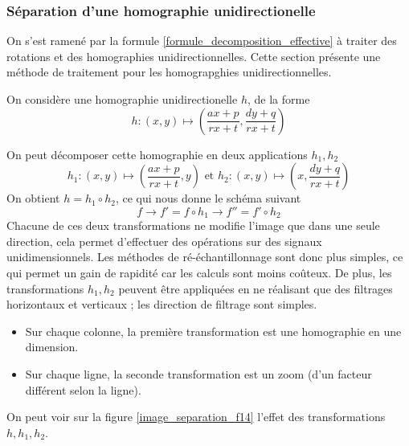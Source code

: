 \subsubsection{Séparation d'une homographie unidirectionelle}

On s'est ramené par la formule \ref{formule_decomposition_effective} à traiter des rotations et des homographies unidirectionnelles. Cette section présente une méthode de traitement pour les homograpghies unidirectionnelles.

\label{homobox_paragraph}

On considère une homographie unidirectionelle $h$, de la forme 
\begin{equation*}
h:(x,y)\mapsto \left(\frac{ax+p}{rx+t},\frac{dy+q}{rx+t}\right)
\end{equation*}

On peut décomposer cette homographie en deux applications $h_1 , h_2$
\begin{equation*}
h_1:(x,y) \mapsto \left(\frac{ax+p}{rx+t},y\right) \text{ et } h_2:(x,y) \mapsto \left(x,\frac{dy+q}{rx+t}\right)
\end{equation*}
On obtient $h=h_1  \circ h_2$, ce qui nous donne le schéma suivant 
\begin{equation*}
f\longrightarrow f'=f\circ h_1 \longrightarrow f''=f'\circ h_2
\end{equation*}
Chacune de ces deux transformations ne modifie l'image que dans une seule direction, cela permet d'effectuer des opérations sur des signaux unidimensionnels. Les méthodes de ré-échantillonnage sont donc plus simples, ce qui permet un gain de rapidité car les calculs sont moins coûteux. De plus, les transformations $h_1,h_2$ peuvent être appliquées en ne réalisant que des filtrages horizontaux et verticaux ; les direction de filtrage sont simples.
\begin{itemize}
\item Sur chaque colonne, la première transformation est une homographie en une dimension.
\item Sur chaque ligne, la seconde transformation est un zoom (d'un facteur différent selon la ligne).
\end{itemize}
On peut voir sur la figure \ref{image_separation_f14} l'effet des transformations $h,h_1,h_2$.

